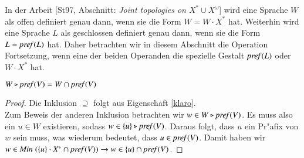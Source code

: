 


In der Arbeit [St97, Abschnitt: \emph{Joint topologies on $X^*\cup X^\omega$}] wird eine Sprache $W$ als offen definiert genau dann, wenn sie die Form $W=W\cdot X^*$ hat. Weiterhin wird eine Sprache $L$ als geschlossen definiert genau dann, wenn sie die Form $L=\mathit{pref{(}}L)$ hat. 
Daher betrachten wir in diesem Abschnitt die Operation Fortsetzung, wenn eine der beiden Operanden die spezielle Gestalt $\mathit{pref{(}}L)$ oder $W\cdot X^*$ hat. 

\vspace{2ex}

\begin{eigen}\label{spezeig1}
$W\triangleright \mathit{pref{(}}V) = W \cap \mathit{pref{(}}V)$
\end{eigen}
\begin{proof}
Die Inklusion $\supseteq$ folgt aus Eigenschaft \ref{klaro}.\\
Zum Beweis der anderen Inklusion betrachten wir $w\in W\triangleright\mathit{pref{(}}V)$. Es muss also ein $u\in W$ existieren, sodass $w\in \{u\}\triangleright\mathit{pref{(}}V)$. Daraus folgt, dass $u$ ein Pr"afix von $w$ sein muss, was wiederum bedeutet, dass $u\in\mathit{pref{(}}V)$. Damit haben wir $w\in\mathit{Min}\;(\{u\}\cdot X^*\cap \mathit{pref{(}}V)) \to w\in \{u\}\cap \mathit{pref{(}}V)$.
\end{proof}


